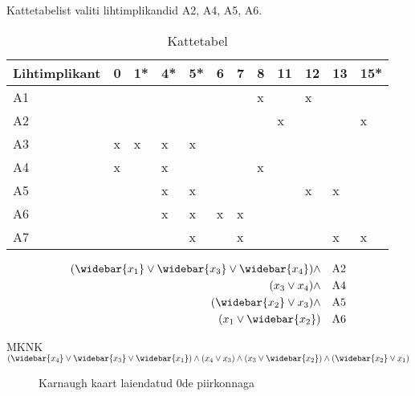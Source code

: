 \documentclass{article}
\begin{document}
Kattetabelist valiti lihtimplikandid A2, A4, A5, A6.
\begin{table}[H]
\centering
\caption{Kattetabel}
\label{kattetabel}
\begin{tabular}{|l|l|l|l|l|l|l|l|l|l|l|l|}
\hline
Lihtimplikant & 0 & 1* & 4* & 5* & 6 & 7 & 8 & 11 & 12 & 13 & 15* \\ \hline
A1            &   &    &    &    &   &   & x &    & x  &    &     \\ \hline
\rowcolor{LightCyan}
A2            &   &    &    &    &   &   &   & x  &    &    & x   \\ \hline
A3            & x & x  & x  & x  &   &   &   &    &    &    &     \\ \hline
\rowcolor{LightCyan}
A4            & x &    & x  &    &   &   & x &    &    &    &     \\ \hline
\rowcolor{LightCyan}
A5            &   &    & x  & x  &   &   &   &    & x  & x  &     \\ \hline
\rowcolor{LightCyan}
A6            &   &    & x  & x  & x & x &   &    &    &    &     \\ \hline
A7            &   &    &    & x  &   & x &   &    &    & x  & x   \\ \hline
\end{tabular}
\end{table}

\begin{align*} 
(\widebar{x_1}\lor\widebar{x_3}\lor\widebar{x_4})\land &&\mbox{A2}\\
(x_3\lor x_4)\land &&\mbox{A4}\\
(\widebar{x_2} \lor x_3)\land &&\mbox{A5}\\
(x_1\lor \widebar{x_2}) &&\mbox{A6}
\end{align*}

MKNK $(\widebar{x_4} \lor \widebar{x_3} \lor \widebar{x_1}) \land (x_4 \lor x_3) \land (x_3 \lor \widebar{x_2}) \land (\widebar{x_2} \lor x_1)$

\begin{figure}[H]
\centering
\begin{Karnaugh}
\end{Karnaugh}
\caption{Karnaugh kaart laiendatud 0de piirkonnaga}
\label{fig:karnaugh-piirkond0}
\end{figure}
\end{document}
